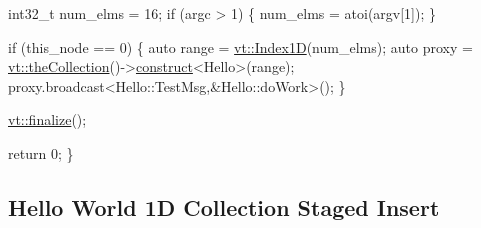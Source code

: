 \begin{DoxyCodeInclude}
  int32\_t num\_elms = 16;
  \textcolor{keywordflow}{if} (argc > 1) \{
    num\_elms = atoi(argv[1]);
  \}

  \textcolor{keywordflow}{if} (this\_node == 0) \{
    \textcolor{keyword}{auto} range = \hyperlink{namespacevt_a5540efc78234273e1796fb003fe4d234}{vt::Index1D}(num\_elms);
    \textcolor{keyword}{auto} proxy = \hyperlink{namespacevt_a1c45ce63bfd2c327ff7d76a319a371d8}{vt::theCollection}()->\hyperlink{structvt_1_1vrt_1_1collection_1_1_collection_manager_a4de84e9efd7a3948e3c20be549441cfd}{construct}<Hello>(range);
    proxy.broadcast<Hello::TestMsg,&Hello::doWork>();
  \}

  \hyperlink{namespacevt_a540d90dbd6e97b69f1dcbc9ee9314cff}{vt::finalize}();

  \textcolor{keywordflow}{return} 0;
\}
\end{DoxyCodeInclude}
 \hypertarget{collection_staged-insert-hello-world-collection}{}\subsection{Hello World 1\+D Collection Staged Insert}\label{collection_staged-insert-hello-world-collection}

